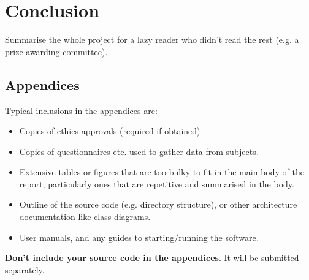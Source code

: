 \documentclass{l4proj}
\begin{document}
\chapter{Conclusion}    
Summarise the whole project for a lazy reader who didn't read the rest (e.g. a prize-awarding committee).

%
% 

\begin{appendices}

\chapter{Appendices}

Typical inclusions in the appendices are:

\begin{itemize}
\item
  Copies of ethics approvals (required if obtained)
\item
  Copies of questionnaires etc. used to gather data from subjects.
\item
  Extensive tables or figures that are too bulky to fit in the main body of
  the report, particularly ones that are repetitive and summarised in the body.

\item Outline of the source code (e.g. directory structure), or other architecture documentation like class diagrams.

\item User manuals, and any guides to starting/running the software.

\end{itemize}

\textbf{Don't include your source code in the appendices}. It will be
submitted separately.

\end{appendices}






\end{document}
